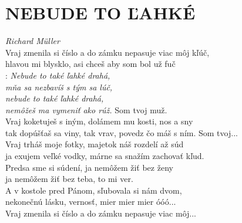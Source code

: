 \section*{\Huge NEBUDE TO ĽAHKÉ}
\emph{Richard Müller}\\

Vraj zmenila si číslo a do zámku nepasuje viac môj kľúč,\\
hlavou mi blysklo, asi chceš aby som bol už fuč\\

\textregistered: \emph{Nebude to také ľahké drahá,\\
mňa sa nezbavíš s tým sa lúč,\\
nebude to také ľahké drahá,\\
nemôžeš ma vymeniť ako rúž.} \hspace{0.4cm} Som tvoj muž.\\

Vraj koketuješ s iným, dolámem mu kosti, nos a sny\\
tak dopúšťaš sa viny, tak vrav, povedz čo máš s ním. \textregistered \hspace{0.2cm} Som tvoj...\\

Vraj trháš moje fotky, majetok náš rozdelí až súd\\
ja exujem veľké vodky, márne sa snažím zachovať kľud. \textregistered\\

Predsa sme si súdení, ja nemôžem žiť bez ženy\\
ja nemôžem žiť bez teba, to mi ver.\\
A v kostole pred Pánom, sľubovala si nám dvom,\\ nekonečnú lásku, vernosť, mier mier mier óóó...  \textregistered\\

Vraj zmenila si číslo a do zámku nepasuje viac môj...
\newpage
